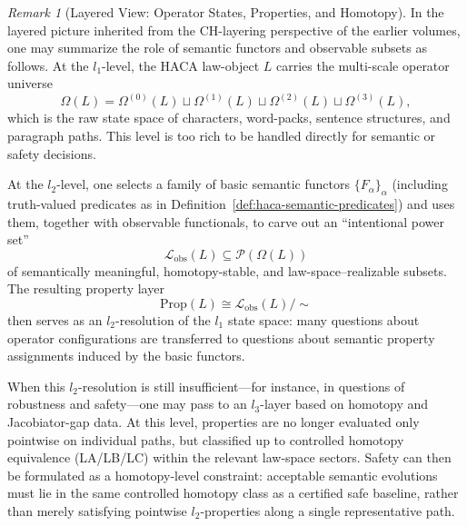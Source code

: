 \documentclass[11pt]{book}
\theoremstyle{plain}
\theoremstyle{definition}
\theoremstyle{remark}
\newtheorem{remark}[theorem]{Remark}
\begin{document}
\begin{remark}[Layered View: Operator States, Properties, and Homotopy]
\label{rem:ch-layering-l1-l3}
In the layered picture inherited from the CH-layering perspective of the
earlier volumes, one may summarize the role of semantic functors and
observable subsets as follows. At the $l_1$-level, the HACA law-object $L$
carries the multi-scale operator universe
\[
  \Omega(L)
  =
  \Omega^{(0)}(L)\sqcup\Omega^{(1)}(L)\sqcup\Omega^{(2)}(L)\sqcup\Omega^{(3)}(L),
\]
which is the raw state space of characters, word-packs, sentence
structures, and paragraph paths. This level is too rich to be handled
directly for semantic or safety decisions.

At the $l_2$-level, one selects a family of basic semantic functors
$\{F_\alpha\}_\alpha$ (including truth-valued predicates as in
Definition~\ref{def:haca-semantic-predicates}) and uses them, together
with observable functionals, to carve out an ``intentional power set''
\[
  \mathcal{L}_{\mathrm{obs}}(L)\subseteq\mathcal{P}(\Omega(L))
\]
of semantically meaningful, homotopy-stable, and law-space–realizable
subsets. The resulting property layer
\[
  \mathrm{Prop}(L)\cong\mathcal{L}_{\mathrm{obs}}(L)/\sim
\]
then serves as an $l_2$-resolution of the $l_1$ state space: many
questions about operator configurations are transferred to questions
about semantic property assignments induced by the basic functors.

When this $l_2$-resolution is still insufficient—for instance, in
questions of robustness and safety—one may pass to an $l_3$-layer based
on homotopy and Jacobiator-gap data. At this level, properties are no
longer evaluated only pointwise on individual paths, but classified up
to controlled homotopy equivalence (LA/LB/LC) within the relevant
law-space sectors. Safety can then be formulated as a homotopy-level
constraint: acceptable semantic evolutions must lie in the same
controlled homotopy class as a certified safe baseline, rather than
merely satisfying pointwise $l_2$-properties along a single
representative path.

\end{remark}
\end{document}
